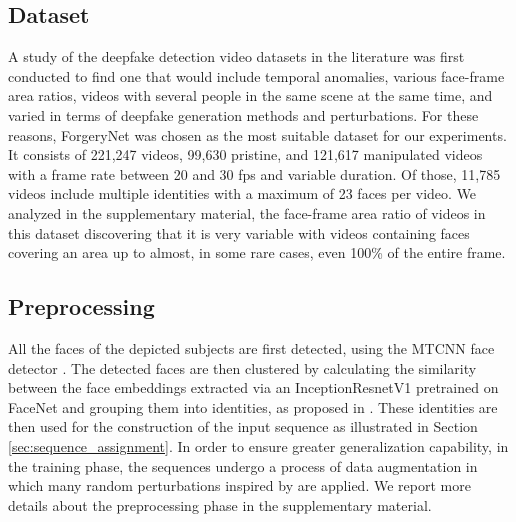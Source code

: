 \documentclass[10pt,twocolumn,letterpaper]{article}
\begin{document}
\subsection{Dataset}


A study of the deepfake detection video datasets in the literature was first conducted to find one that would include temporal anomalies, various face-frame area ratios, videos with several people in the same scene at the same time, and varied in terms of deepfake generation methods and perturbations.  
For these reasons, ForgeryNet\cite{forgerynet} was chosen as the most suitable dataset for our experiments. It consists of 221,247 videos, 99,630 pristine, and 121,617 manipulated videos with a frame rate between 20 and 30 fps and variable duration. Of those, 11,785 videos include multiple identities with a maximum of 23 faces per video. We analyzed in the supplementary material, the face-frame area ratio of videos in this dataset discovering that it is very variable with videos containing faces covering an area up to almost, in some rare cases, even 100\% of the entire frame.

\subsection{Preprocessing}
All the faces of the depicted subjects are first detected, using the MTCNN face detector \cite{mtcnn}. The detected faces are then clustered by calculating the similarity between the face embeddings extracted via an InceptionResnetV1 pretrained on FaceNet\cite{facenet} and grouping them into identities, as proposed in \cite{preprocessing}. These identities are then used for the construction of the input sequence as illustrated in Section \ref{sec:sequence_assignment}. In order to ensure greater generalization capability, in the training phase, the sequences undergo a process of data augmentation in which many random perturbations inspired by \cite{forgerynet} are applied. We report more details about the preprocessing phase in the supplementary material.
\end{document}
